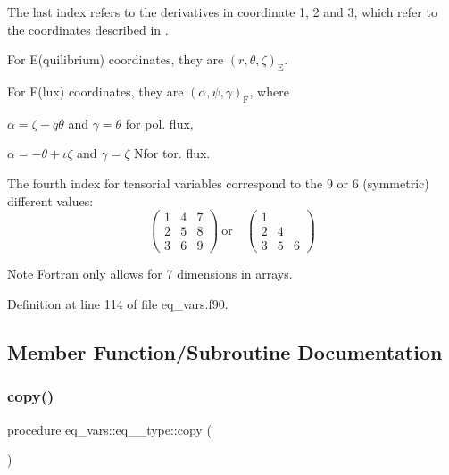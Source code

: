 The last index refers to the derivatives in coordinate 1, 2 and 3, which refer to the coordinates described in \cite{Weyens3D}.
\begin{DoxyItemize}
\item For E(quilibrium) coordinates, they are $\left(r,\theta,\zeta\right)_\text{E}$.
\item For F(lux) coordinates, they are $\left(\alpha,\psi,\gamma\right)_\text{F}$, where
\begin{DoxyItemize}
\item $\alpha = \zeta - q \theta$ and $\gamma = \theta$ for pol. flux,
\item $\alpha = -\theta + \iota \zeta$ and $\gamma = \zeta$ Nfor tor. flux.
\end{DoxyItemize}
\end{DoxyItemize}

The fourth index for tensorial variables correspond to the 9 or 6 (symmetric) different values\+: \[ \left( \begin{array}{ccc}1&4&7\\2&5&8\\3&6&9\end{array} \right) \ \text{or} \quad \left( \begin{array}{ccc}1& & \\2&4& \\3&5&6\end{array} \right) \]

\begin{DoxyNote}{Note}
Fortran only allows for 7 dimensions in arrays. 
\end{DoxyNote}


Definition at line 114 of file eq\+\_\+vars.\+f90.



\subsection{Member Function/\+Subroutine Documentation}
\mbox{\label{structeq__vars_1_1eq__2__type_a05c42f5918724fa397f69f992732813c}} 
\subsubsection{\texorpdfstring{copy()}{copy()}}
{\footnotesize\ttfamily procedure eq\+\_\+vars\+::eq\+\_\+\_\+type\+::copy (\begin{DoxyParamCaption}{ }\end{DoxyParamCaption})}



